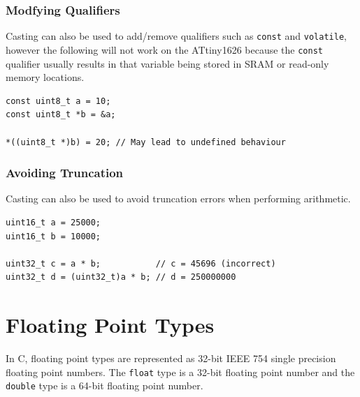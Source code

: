 \documentclass[a4paper]{report}
\begin{document}
\subsubsection{Modfying Qualifiers}
Casting can also be used to add/remove qualifiers such as \texttt{const} and \texttt{volatile},
however the following will not work on the ATtiny1626 because the \texttt{const} qualifier
usually results in that variable being stored in SRAM or read-only memory locations.
\begin{verbatim}
const uint8_t a = 10;
const uint8_t *b = &a;

*((uint8_t *)b) = 20; // May lead to undefined behaviour
\end{verbatim}
\subsubsection{Avoiding Truncation}
Casting can also be used to avoid truncation errors when performing arithmetic.
\begin{verbatim}
uint16_t a = 25000;
uint16_t b = 10000;

uint32_t c = a * b;           // c = 45696 (incorrect)
uint32_t d = (uint32_t)a * b; // d = 250000000
\end{verbatim}
\section{Floating Point Types}
In C, floating point types are represented as 32-bit IEEE 754 single precision
floating point numbers. The \texttt{float} type is a 32-bit floating point number and
the \texttt{double} type is a 64-bit floating point number.
\end{document}
